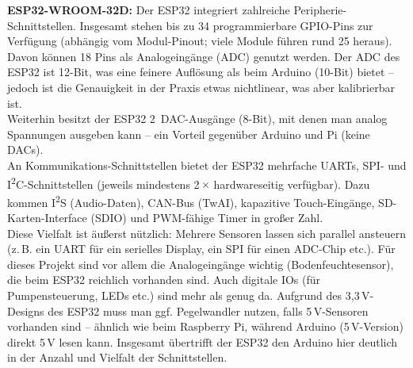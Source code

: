 \noindent\textbf{ESP32-WROOM-32D:} Der ESP32 integriert zahlreiche Peripherie-Schnittstellen. Insgesamt stehen bis zu 34 programmierbare GPIO-Pins zur Verfügung (abhängig vom Modul-Pinout; viele Module führen rund 25 heraus). Davon können 18 Pins als Analogeingänge (ADC) genutzt werden. \autocite{esp32_comparison} Der ADC des ESP32 ist 12-Bit, was eine feinere Auflösung als beim Arduino (10-Bit) bietet – jedoch ist die Genauigkeit in der Praxis etwas nichtlinear, was aber kalibrierbar ist. 
\\
Weiterhin besitzt der ESP32 2~DAC-Ausgänge (8-Bit), mit denen man analog Spannungen ausgeben kann – ein Vorteil gegenüber Arduino und Pi (keine DACs). 
\\
An Kommunikations-Schnittstellen bietet der ESP32 mehrfache UARTs, SPI- und I\textsuperscript{2}C-Schnittstellen (jeweils mindestens 2\,$\times$ hardwareseitig verfügbar). Dazu kommen I\textsuperscript{2}S (Audio-Daten), CAN-Bus (TwAI), kapazitive Touch-Eingänge, SD-Karten-Interface (SDIO) und PWM-fähige Timer in großer Zahl. \autocite{esp_datasheet}  
\\
Diese Vielfalt ist äußerst nützlich: Mehrere Sensoren lassen sich parallel ansteuern (z.\,B. ein UART für ein serielles Display, ein SPI für einen ADC-Chip etc.). Für dieses Projekt sind vor allem die Analogeingänge wichtig (Bodenfeuchtesensor), die beim ESP32 reichlich vorhanden sind. Auch digitale IOs (für Pumpensteuerung, LEDs etc.) sind mehr als genug da. Aufgrund des 3{,}3\,V-Designs des ESP32 muss man ggf. Pegelwandler nutzen, falls 5\,V-Sensoren vorhanden sind – ähnlich wie beim Raspberry Pi, während Arduino (5\,V-Version) direkt 5\,V lesen kann. Insgesamt übertrifft der ESP32 den Arduino hier deutlich in der Anzahl und Vielfalt der Schnittstellen.

\vspace{5mm}

